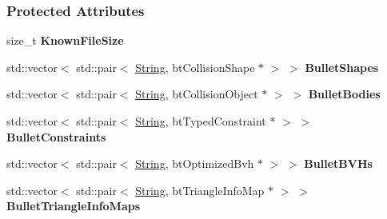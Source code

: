 \subsubsection*{Protected Attributes}
\begin{DoxyCompactItemize}
\item 
\hypertarget{classphys_1_1internal_1_1BulletFile_acc5d2fad35f5de8285d2718ef4810f6c}{
size\_\-t {\bfseries KnownFileSize}}
\label{d4/dcc/classphys_1_1internal_1_1BulletFile_acc5d2fad35f5de8285d2718ef4810f6c}

\item 
\hypertarget{classphys_1_1internal_1_1BulletFile_a27074c0ada2979754653110d53c70d8f}{
std::vector$<$ std::pair$<$ \hyperlink{namespacephys_aa03900411993de7fbfec4789bc1d392e}{String}, btCollisionShape $\ast$ $>$ $>$ {\bfseries BulletShapes}}
\label{d4/dcc/classphys_1_1internal_1_1BulletFile_a27074c0ada2979754653110d53c70d8f}

\item 
\hypertarget{classphys_1_1internal_1_1BulletFile_aa06c20e012deb7f7cae320d97104334e}{
std::vector$<$ std::pair$<$ \hyperlink{namespacephys_aa03900411993de7fbfec4789bc1d392e}{String}, btCollisionObject $\ast$ $>$ $>$ {\bfseries BulletBodies}}
\label{d4/dcc/classphys_1_1internal_1_1BulletFile_aa06c20e012deb7f7cae320d97104334e}

\item 
\hypertarget{classphys_1_1internal_1_1BulletFile_a9735286a72dcdc0885d72db07e2ba3a0}{
std::vector$<$ std::pair$<$ \hyperlink{namespacephys_aa03900411993de7fbfec4789bc1d392e}{String}, btTypedConstraint $\ast$ $>$ $>$ {\bfseries BulletConstraints}}
\label{d4/dcc/classphys_1_1internal_1_1BulletFile_a9735286a72dcdc0885d72db07e2ba3a0}

\item 
\hypertarget{classphys_1_1internal_1_1BulletFile_a6effca8b3d75b4253e1fa2f9557d381a}{
std::vector$<$ std::pair$<$ \hyperlink{namespacephys_aa03900411993de7fbfec4789bc1d392e}{String}, btOptimizedBvh $\ast$ $>$ $>$ {\bfseries BulletBVHs}}
\label{d4/dcc/classphys_1_1internal_1_1BulletFile_a6effca8b3d75b4253e1fa2f9557d381a}

\item 
\hypertarget{classphys_1_1internal_1_1BulletFile_ae5f52ca26360b6f1143a46999255b6f2}{
std::vector$<$ std::pair$<$ \hyperlink{namespacephys_aa03900411993de7fbfec4789bc1d392e}{String}, btTriangleInfoMap $\ast$ $>$ $>$ {\bfseries BulletTriangleInfoMaps}}
\label{d4/dcc/classphys_1_1internal_1_1BulletFile_ae5f52ca26360b6f1143a46999255b6f2}

\end{DoxyCompactItemize}


